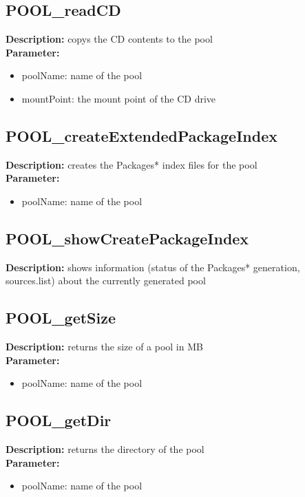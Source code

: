 \subsection{POOL\_readCD}
\textbf{Description:} copys the CD contents to the pool\\
\textbf{Parameter:}
\begin{itemize}
\item poolName: name of the pool
\item mountPoint: the mount point of the CD drive
\end{itemize}

\subsection{POOL\_createExtendedPackageIndex}
\textbf{Description:} creates the Packages* index files for the pool\\
\textbf{Parameter:}
\begin{itemize}
\item poolName: name of the pool
\end{itemize}

\subsection{POOL\_showCreatePackageIndex}
\textbf{Description:} shows information (status of the Packages* generation, sources.list) about the currently generated pool\\

\subsection{POOL\_getSize}
\textbf{Description:} returns the size of a pool in MB\\
\textbf{Parameter:}
\begin{itemize}
\item poolName: name of the pool
\end{itemize}

\subsection{POOL\_getDir}
\textbf{Description:} returns the directory of the pool\\
\textbf{Parameter:}
\begin{itemize}
\item poolName: name of the pool
\end{itemize}

